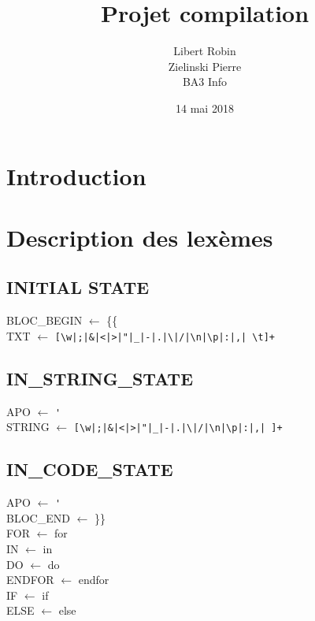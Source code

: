﻿\documentclass{report}
\title{Projet compilation}
\author{Libert Robin\\ Zielinski Pierre \\ BA3 Info}
\date{14 mai 2018}
\begin{document}
\maketitle

\section*{ Introduction}


\section*{ Description des lexèmes}

\subsection*{INITIAL STATE}

BLOC\_BEGIN $\leftarrow$ \{\{\\

TXT $\leftarrow$ \verb![\w|;|&|<|>|"|_|-|.|\|/|\n|\p|:|,| \t]+!

\subsection*{IN\_STRING\_STATE}

APO $\leftarrow$ \verb!'!\\

STRING $\leftarrow$ \verb![\w|;|&|<|>|"|_|-|.|\|/|\n|\p|:|,| ]+!

\subsection*{IN\_CODE\_STATE}

APO $\leftarrow$ \verb!'!\\

BLOC\_END $\leftarrow$ \}\}\\

FOR $\leftarrow$ for\\

IN $\leftarrow$ in\\

DO $\leftarrow$ do\\

ENDFOR $\leftarrow$ endfor\\

IF $\leftarrow$ if\\

ELSE $\leftarrow$ else\\
\end{document}
